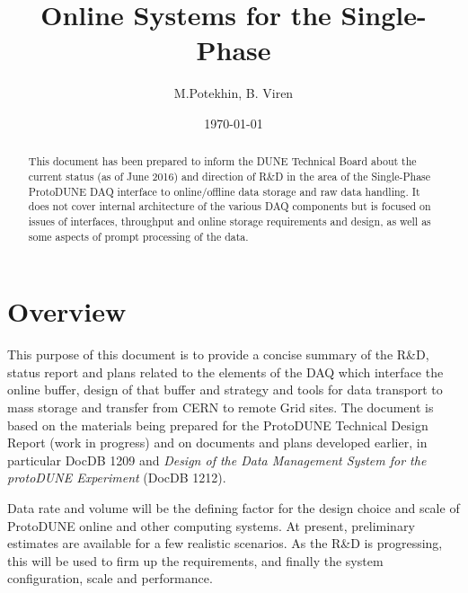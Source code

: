 \documentclass[pdftex,12pt,letter]{article}
\title{Online Systems for the Single-Phase \pd}
\date{\today}
\author{M.Potekhin, B. Viren}
\newcommand{\pd}{ProtoDUNE\xspace}
\begin{document}

\maketitle

\begin{abstract}
\noindent This document has been prepared to inform the DUNE Technical Board about the current status
(as of June 2016) and direction of R\&D in the area of the Single-Phase \pd DAQ interface to online/offline data storage
and raw data handling. It does not cover internal architecture of the various DAQ components but is focused on
issues of interfaces, throughput and online storage requirements and design, as well as some aspects of prompt
processing of the data.
\end{abstract}


\pagebreak

\section{Overview}

This purpose of this document is to provide a concise summary of
the R\&D, status report and plans related to the elements of the DAQ which interface
the online buffer, design of that buffer and strategy and tools
for data transport to mass storage and transfer from CERN to remote Grid sites.
The document is based on the materials being prepared for the \pd Technical Design Report  (work in progress)
and on documents and plans developed earlier, in particular DocDB 1209 and \textit{Design of
the Data Management System for the protoDUNE Experiment} (DocDB 1212).

Data rate and volume will be the defining factor for the design choice and scale of \pd online and other computing systems.
At present, preliminary estimates are available for a few realistic scenarios. As the R\&D is progressing, this will
be used to firm up the requirements, and finally the system configuration, scale and performance.
\end{document}
